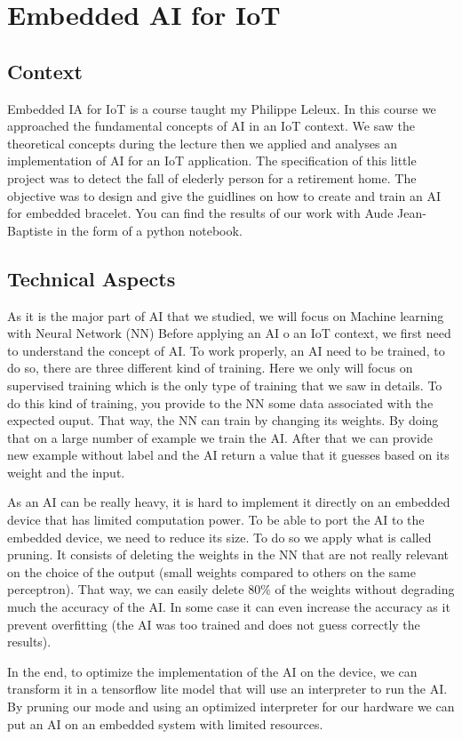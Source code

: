 \section{Embedded AI for IoT}

\subsection{Context}

Embedded IA for IoT is a course taught my Philippe Leleux. In this course we approached the fundamental concepts of AI in an IoT context. We saw the theoretical concepts during the lecture then we applied and analyses an implementation of AI for an IoT application. The specification of this little project was to detect the fall of elederly person for a retirement home. The objective was to design and give the guidlines on how to create and train an AI for embedded bracelet. You can find the results of our work with Aude Jean-Baptiste in the form of a python notebook.

\subsection{Technical Aspects}

As it is the major part of AI that we studied, we will focus on Machine learning with Neural Network (NN)
Before applying an AI o an IoT context, we first need to understand the concept of AI. To work properly, an AI need to be trained, to do so, there are three different kind of training. Here we only will focus on supervised training which is the only type of training that we saw in details. To do this kind of training, you provide to the NN some data associated with the expected ouput. That way, the NN can train by changing its weights. By doing that on a large number of example we train the AI. After that we can provide new example without label and the AI return a value that it guesses based on its weight and the input. 
\\\par
As an AI can be really heavy, it is hard to implement it directly on an embedded device that has limited computation power. To be able to port the AI to the embedded device, we need to reduce its size. To do so we apply what is called pruning. It consists of deleting the weights in the NN that are not really relevant on the choice of the output (small weights compared to others on the same perceptron). That way, we can easily delete 80\% of the weights without degrading much the accuracy of the AI. In some case it can even increase the accuracy as it prevent overfitting (the AI was too trained and does not guess correctly the results).
\\\par
In the end, to optimize the implementation of the AI on the device, we can transform it in a tensorflow lite model that will use an interpreter to run the AI. By pruning our mode and using an optimized interpreter for our hardware we can put an AI on an embedded system with limited resources.

